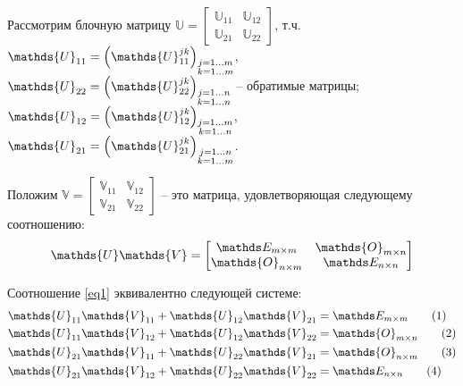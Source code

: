 \newcommand{\bbU}{\mathds{U}}
\newcommand{\bbV}{\mathds{V}}
\newcommand{\bbO}{\mathds{O}}

\newcommand\numberthis{\refstepcounter{equation}\tag{\theequation}} 

Рассмотрим блочную матрицу $\bbU = \begin{bmatrix} \bbU_{11} & \bbU_{12} \\ \bbU_{21} & \bbU_{22} \end{bmatrix}$, т.ч. 
$\bbU_{11} = \lb \bbU_{11}^{jk} \rb_{\substack{j = 1 \dots m \\ k = 1 \dots m}}$,
$\bbU_{22} = \lb \bbU_{22}^{jk} \rb_{\substack{j = 1 \dots n \\ k = 1 \dots n}}$ -- обратимые матрицы; 
$\bbU_{12} = \lb \bbU_{12}^{jk} \rb_{\substack{j = 1 \dots m \\ k = 1 \dots n}}$, 
$\bbU_{21} = \lb \bbU_{21}^{jk} \rb_{\substack{j = 1 \dots n \\ k = 1 \dots m}}$.

Положим $\bbV = \begin{bmatrix} \bbV_{11} & \bbV_{12} \\ \bbV_{21} & \bbV_{22} \end{bmatrix}$ -- это матрица, удовлетворяющая следующему соотношению:
\begin{gather}
\bbU \bbV = \begin{bmatrix}
\bbE_{m \times m} & \bbO_{m \times n} \\
\bbO_{n \times m} & \bbE_{n \times n} 
\end{bmatrix} \label{eq1}
\end{gather} 

Соотношение  \eqref{eq1} эквивалентно следующей системе:
\vspace*{-0.25cm}
\begin{align*}
\bbU_{11} \bbV_{11} &+ \bbU_{12} \bbV_{21} = \bbE_{m \times m} \numberthis \\
\bbU_{11} \bbV_{12} &+ \bbU_{12} \bbV_{22} = \bbO_{m \times n} \numberthis \\
\bbU_{21} \bbV_{11} &+ \bbU_{22} \bbV_{21} = \bbO_{n \times m} \numberthis \\
\bbU_{21} \bbV_{12} &+ \bbU_{22} \bbV_{22} = \bbE_{n \times n} \numberthis
\end{align*}
